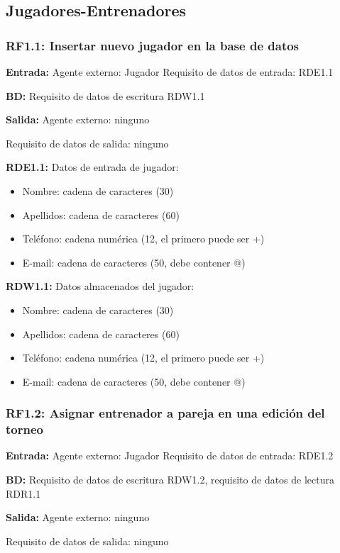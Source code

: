 \subsection{Jugadores-Entrenadores}

\subsubsection{RF1.1: Insertar nuevo jugador en la base de datos}

\textbf{Entrada:} Agente externo: Jugador        Requisito de datos de entrada: RDE1.1

\textbf{BD:} Requisito de datos de escritura RDW1.1

\textbf{Salida:} Agente externo: ninguno

Requisito de datos de salida: ninguno

\textbf{RDE1.1:} Datos de entrada de jugador:
\begin{itemize}
	\item Nombre: cadena de caracteres (30)
	\item Apellidos: cadena de caracteres (60)
	\item Teléfono: cadena numérica (12, el primero puede ser +)
	\item E-mail: cadena de caracteres (50, debe contener @)
\end{itemize}
\textbf{RDW1.1:} Datos almacenados del jugador:
\begin{itemize}
	\item Nombre: cadena de caracteres (30)
	\item Apellidos: cadena de caracteres (60)
	\item Teléfono: cadena numérica (12, el primero puede ser +)
	\item E-mail: cadena de caracteres (50, debe contener @)
\end{itemize}


\subsubsection{RF1.2: Asignar entrenador a pareja en una edición del torneo}

\textbf{Entrada:} Agente externo: Jugador        Requisito de datos de entrada: RDE1.2

\textbf{BD:} Requisito de datos de escritura RDW1.2, requisito de datos de lectura RDR1.1

\textbf{Salida:} Agente externo: ninguno

Requisito de datos de salida: ninguno

